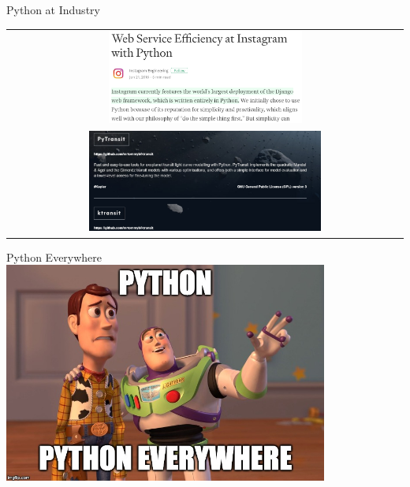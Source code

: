 	\begin{frame}{Python at Industry \cite{instagram_engineering}}
		\centering
		\begin{tabular}{c}
		\includegraphics[width=0.5\textwidth]{images/instagram_python.png}\\
		\includegraphics[width=0.6\textwidth]{images/nasa_python.png}
		\end{tabular}
	\end{frame}

    \begin{frame}{Python Everywhere}
		\centering
		\includegraphics[width=0.8\textwidth]{images/python_everywhere.jpg}
	\end{frame}



